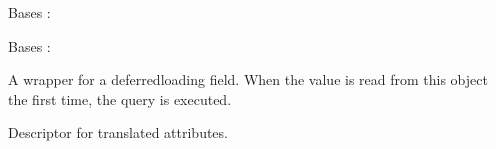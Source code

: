 \documentclass[letterpaper,10pt,french]{sphinxmanual}
\begin{document}
\begin{fulllineitems}
\begin{fulllineitems}
\end{fulllineitems}


\begin{fulllineitems}
\label{\detokenize{index:core.models.SwimmingPoolInfo.DoesNotExist}}
\pysigstartsignatures
\pysigline
{}
\pysigstopsignatures
\sphinxAtStartPar
Bases : 

\end{fulllineitems}


\begin{fulllineitems}
\label{\detokenize{index:core.models.SwimmingPoolInfo.MultipleObjectsReturned}}
\pysigstartsignatures
\pysigline
{}
\pysigstopsignatures
\sphinxAtStartPar
Bases : 

\end{fulllineitems}


\begin{fulllineitems}
\label{\detokenize{index:core.models.SwimmingPoolInfo.id}}
\pysigstartsignatures
\pysigline
{}
\pysigstopsignatures
\sphinxAtStartPar
A wrapper for a deferred\sphinxhyphen{}loading field. When the value is read from this
object the first time, the query is executed.

\end{fulllineitems}


\begin{fulllineitems}
\label{\detokenize{index:core.models.SwimmingPoolInfo.pool_opening_end}}
\pysigstartsignatures
\pysigline
{}
\pysigstopsignatures
\sphinxAtStartPar
Descriptor for translated attributes.


\end{fulllineitems}
\end{fulllineitems}
\end{document}
